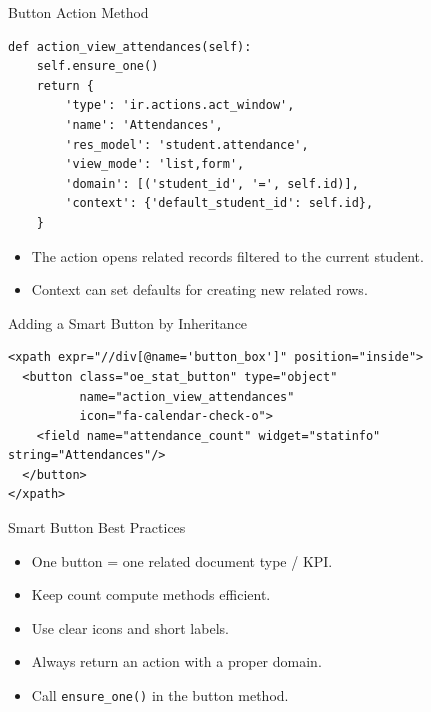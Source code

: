 \begin{frame}[fragile]{Button Action Method}
\begin{lstlisting}
def action_view_attendances(self):
	self.ensure_one()
	return {
		'type': 'ir.actions.act_window',
		'name': 'Attendances',
		'res_model': 'student.attendance',
		'view_mode': 'list,form',
		'domain': [('student_id', '=', self.id)],
		'context': {'default_student_id': self.id},
	}
\end{lstlisting}
	\begin{itemize}
		\item The action opens related records filtered to the current student.
		\item Context can set defaults for creating new related rows.
	\end{itemize}
\end{frame}

\begin{frame}[fragile]{Adding a Smart Button by Inheritance}
\begin{lstlisting}[style=xml]
<xpath expr="//div[@name='button_box']" position="inside">
  <button class="oe_stat_button" type="object"
		  name="action_view_attendances"
		  icon="fa-calendar-check-o">
	<field name="attendance_count" widget="statinfo" string="Attendances"/>
  </button>
</xpath>
\end{lstlisting}
\end{frame}

\begin{frame}{Smart Button Best Practices}
	\begin{itemize}
		\item One button = one related document type / KPI.
		\item Keep count compute methods efficient.
		\item Use clear icons and short labels.
		\item Always return an action with a proper domain.
		\item Call \texttt{ensure\_one()} in the button method.
	\end{itemize}
\end{frame}
